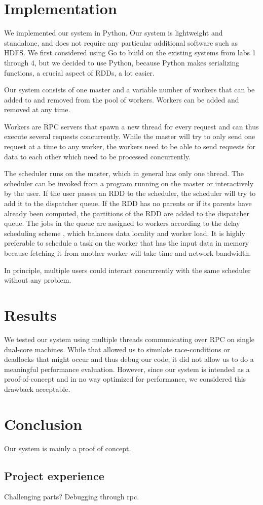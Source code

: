 \documentclass[10pt]{article}
\begin{document}
\section*{Implementation} We implemented our system in Python. Our system is
lightweight and standalone, and does not require any particular additional
software such as HDFS. We first considered using Go to build on the existing
systems from labs 1 through 4, but we decided to use Python, because Python
makes serializing functions, a crucial aspect of RDDs, a lot easier.

Our system consists of one master and a variable number of workers that can be
added to and removed from the pool of workers. Workers can be added and removed
at any time.

Workers are RPC servers that spawn a new thread for every request and can thus
execute several requests concurrently. While the master will try to only send
one request at a time to any worker, the workers need to be able to send
requests for data to each other which need to be processed concurrently.

The scheduler runs on the master, which in general has only one thread. The
scheduler can be invoked from a program running on the master or interactively
by the user.  If the user passes an RDD to the scheduler, the scheduler will
try to add it to the dispatcher queue. If the RDD has no parents or if its
parents have already been computed, the partitions of the RDD are added to the
dispatcher queue. The jobs in the queue are assigned to workers according to
the delay scheduling scheme \cite{delay}, which balances data locality and
worker load. It is highly preferable to schedule a task on the worker that has
the input data in memory because fetching it from another worker will take time
and network bandwidth.

In principle, multiple users could interact concurrently with the same
scheduler without any problem.

\section*{Results} We tested our system using multiple threads communicating
over RPC on single dual-core machines. While that allowed us to simulate
race-conditions or deadlocks that might occur and thus debug our code, it did
not allow us to do a meaningful performance evaluation. However, since our
system is intended as a proof-of-concept and in no way optimized for
performance, we considered this drawback acceptable.

\section*{Conclusion} Our system is mainly a proof of concept.

\subsection*{Project experience} Challenging parts? Debugging through rpc.




 
\end{document}
